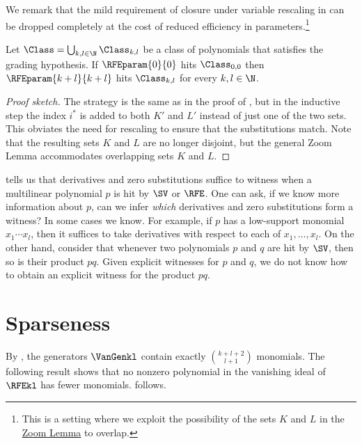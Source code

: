 \documentclass{toc}
\begin{document}
We remark that the mild requirement of closure under variable rescaling in  can be dropped completely at the cost of reduced efficiency in parameters.\footnote{This is a setting where we exploit the possibility of the sets $K$ and $L$ in the \hyperref[lem.multi-zsub-deriv]{Zoom Lemma} to overlap.}
\begin{proposition}\label{prop.zsub-deriv-power-variant}
Let $\Class = \bigcup_{k,l \in \N} \Class_{k,l}$ be a class of polynomials that satisfies the grading hypothesis. If $\RFEparam{0}{0}$ hits $\Class_{0,0}$ then 
\(\RFEparam{k+l}{k+l}\) hits \(\Class_{k,l}\) for every \(k,l \in \N\).
\end{proposition}
\begin{proof}[Proof sketch]
The strategy is the same as in the proof of , but in the inductive step the index $i^*$ is added to both $K'$ and $L'$ instead of just one of the two sets. This obviates the need for rescaling to ensure that the substitutions match. Note that the resulting sets $K$ and $L$ are no longer disjoint, but the general Zoom Lemma accommodates overlapping sets $K$ and $L$.
\end{proof}

 tells us that derivatives and zero substitutions
suffice to witness when a multilinear polynomial \(p\) is hit by \(\SV\) or
\(\RFE\).
One can ask,
if we know more information about \(p\),
can we infer \emph{which} derivatives and zero substitutions form a witness?
In some cases we know.
For example,
if \(p\) has a low-support monomial \(x_1\cdots x_l\),
then it suffices to take derivatives with respect to each of
\(x_1,\ldots,x_l\).
On the other hand,
consider that whenever two polynomials \(p\) and \(q\) are hit by \(\SV\),
then so is their product \(pq\).
Given explicit witnesses for \(p\) and \(q\),
we do not know how to obtain an explicit witness for the product \(pq\).



\section{Sparseness}
\label{s.sparse}

By ,
the generators $\VanGenkl$ contain exactly $\binom{k+l+2}{l+1}$ monomials.
The following result shows that no nonzero polynomial in the vanishing ideal
of $\RFEkl$ has fewer monomials.
 follows.
\end{document}
